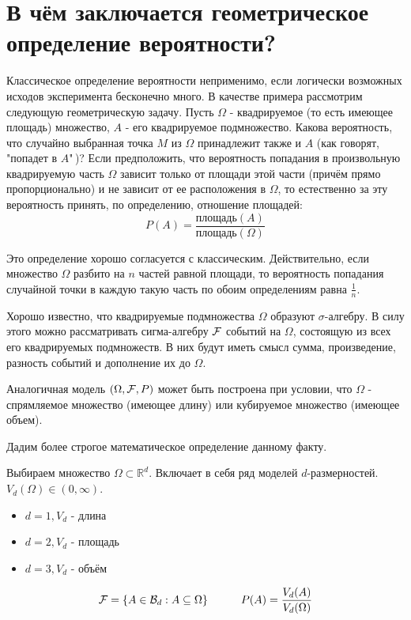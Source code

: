 \section{В чём заключается геометрическое определение вероятности?}

Классическое определение вероятности неприменимо, если логически возможных исходов эксперимента бесконечно много. В качестве примера рассмотрим следующую геометрическую задачу. Пусть $\Omega$ - квадрируемое (то есть имеющее площадь) множество, $A$ - его квадрируемое подмножество. Какова вероятность, что случайно выбранная точка $M$ из $\Omega$ принадлежит также и $A$ (как говорят, "попадет в $A$"\,)? Если предположить, что вероятность попадания в произвольную квадрируемую часть $\Omega$ зависит только от площади этой части (причём прямо пропорционально) и не зависит от ее расположения в $\Omega$, то естественно за эту вероятность принять, по определению, отношение площадей:
\[ P(A) = \frac{\text{площадь}(A)}{\text{площадь}(\Omega)} \]

Это определение хорошо согласуется с классическим. Действительно, если множество $\Omega$ разбито на $n$ частей равной площади, то вероятность попадания случайной точки в каждую такую часть по обоим определениям равна $\frac{1}{n}$.

Хорошо известно, что квадрируемые подмножества $\Omega$ образуют $\sigma$-алгебру. В силу этого можно рассматривать сигма-алгебру ${\mathcal F}$ событий на $\Omega$, состоящую из всех его квадрируемых подмножеств. В них будут иметь смысл сумма, произведение, разность событий и дополнение их до $\Omega$.

Аналогичная модель $(\Omega, {\mathcal F}, P)$ может быть построена при условии, что $\Omega$ - спрямляемое множество (имеющее длину) или кубируемое множество (имеющее объем).

Дадим более строгое математическое определение данному факту.

Выбираем множество $\Omega \subset\mathbb{R}^d$. Включает в себя ряд моделей $d$-размерностей. $V_d(\Omega) \in (0, \infty)$.

\begin{itemize}
	\item $d = 1, V_d$ - длина
	\item $d = 2, V_d$ - площадь
	\item $d = 3, V_d$ - объём
\end{itemize}

\[ {\mathcal F} = \{ A \in \mathcal{B}_d : A \subseteq \Omega \} ~~~~~~~~~ P(A) = \frac{V_d (A)}{V_d (\Omega)} \]

